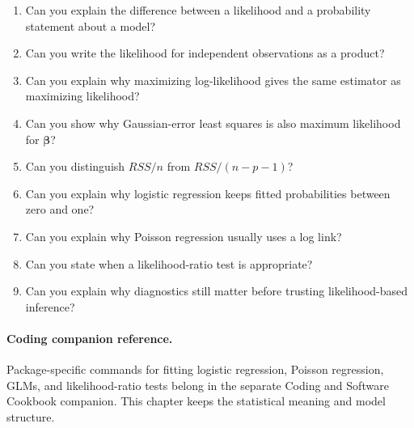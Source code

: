 \begin{enumerate}
  \item Can you explain the difference between a likelihood and a probability statement about a model?
  \item Can you write the likelihood for independent observations as a product?
  \item Can you explain why maximizing log-likelihood gives the same estimator as maximizing likelihood?
  \item Can you show why Gaussian-error least squares is also maximum likelihood for \(\boldsymbol{\beta}\)?
  \item Can you distinguish \(RSS/n\) from \(RSS/(n-p-1)\)?
  \item Can you explain why logistic regression keeps fitted probabilities between zero and one?
  \item Can you explain why Poisson regression usually uses a log link?
  \item Can you state when a likelihood-ratio test is appropriate?
  \item Can you explain why diagnostics still matter before trusting likelihood-based inference?
\end{enumerate}

\paragraph{Coding companion reference.}
Package-specific commands for fitting logistic regression, Poisson regression, GLMs, and likelihood-ratio tests belong in the separate Coding and Software Cookbook companion.  This chapter keeps the statistical meaning and model structure.
